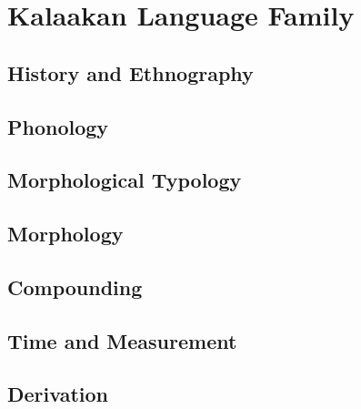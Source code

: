 \documentclass[12pt,letterpaper,openany,twoside]{memoir}
\let\originalpart=\part
\def\part{\cleardoublepage\originalpart}
\begin{document}








\part{Kalaakan Language Family}

\chapter{History and Ethnography}

\chapter{Phonology}

\chapter{Morphological Typology}

\chapter{Morphology}

\chapter{Compounding}

\chapter{Time and Measurement}

\chapter{Derivation}
\end{document}
